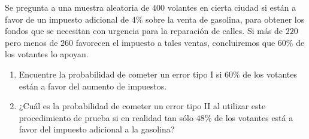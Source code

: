 \begin{enunciado}
 Se pregunta a una muestra aleatoria de $400$ volantes en cierta ciudad si est\'an a favor de un impuesto adicional de $4\%$ sobre la venta de gasolina, para obtener los fondos que se necesitan con urgencia para la reparaci\'on de calles. Si m\'as de $220$ pero menos de $260$ favorecen el impuesto a tales ventas, concluiremos que $60\%$ de los votantes lo apoyan.
 \begin{enumerate}
  \item Encuentre la probabilidad de cometer un error tipo I si $60\%$ de los votantes est\'an a favor del aumento de impuestos.
  
  \item ¿Cu\'al es la probabilidad de cometer un error tipo II al utilizar este procedimiento de prueba si en realidad tan s\'olo $48\%$ de los votantes est\'a a favor del impuesto adicional a la gasolina?
 \end{enumerate}
\end{enunciado}


